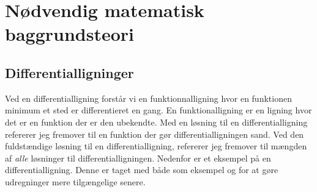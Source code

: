 \section{Nødvendig matematisk baggrundsteori}
\subsection{Differentialligninger}
\newcommand{\LosEks}{$ \{ c\cdot e^{kx}|c\in \mR \} $}%
Ved en differentialligning forstår vi en funktionnalligning hvor en funktionen minimum et sted er differentieret en gang.
En funktionalligning er en ligning hvor det er en funktion der er den ubekendte. 
Med en løsning til en differentialligning refererer jeg fremover til en funktion der gør differentialligningen sand. 
Ved den fuldstændige løsning til en differentialligning, refererer jeg fremover til mængden af \emph{alle} løsninger til differentialligningen. 
Nedenfor er et eksempel på en differentialligning. 
Denne er taget med både som eksempel og for at gøre udregninger mere tilgængelige senere.

